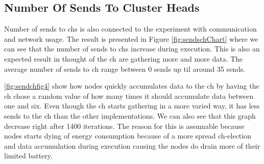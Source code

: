 \documentclass[USenglish]{uit-thesis}
\begin{document}




\newpage

\subsection{Number Of Sends To Cluster Heads}
Number of sends to \glspl{ch} is also connected to the experiment with communication and network usage. The result is presented in Figure \ref{fig:sendschChart} where we can see that the number of sends to \glspl{ch} increase during execution. This is also an expected result in thought of the \gls{ch} are gathering more and more data. The average number of sends to \gls{ch} range between $0$ sends up til around 35 sends.

\autoref{fig:sendchfig4} show how nodes quickly accumulates data to the \gls{ch} by having the \gls{ch} chose a random value of how many times it should accumulate data between one and six. Even though the \gls{ch} starts gathering in a more varied way, it has less sends to the \gls{ch} than the other implementations. We can also see that this graph decrease right after 1400 iterations. The reason for this is assumable because nodes starts dying of energy consumption because of a more spread \gls{ch}-election and data accumulation during execution causing the nodes do drain more of their limited battery.


\end{document}
